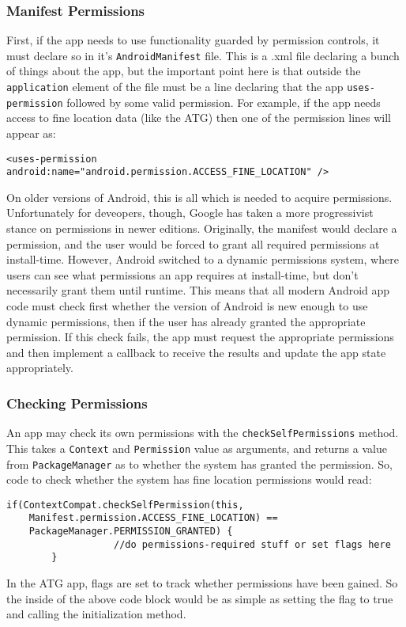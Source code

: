 \subsubsection{Manifest Permissions}
First, if the app needs to use functionality guarded by permission controls, it must declare so in it's \verb|AndroidManifest| file. This is a .xml file declaring a bunch of
things about the app, but the important point here is that outside the \verb|application| element of the file must be a line declaring that the app \verb|uses-permission|
followed by some valid permission. For example, if the app needs access to fine location data (like the ATG) then one of the permission lines will appear as:
\begin{verbatim}
<uses-permission android:name="android.permission.ACCESS_FINE_LOCATION" />
\end{verbatim}
On older versions of Android, this is all which is needed to acquire permissions. Unfortunately for deveopers, though, Google has taken a more progressivist stance on
permissions in newer editions. Originally, the manifest would declare a permission, and the user would be forced to grant all required permissions at install-time. However,
Android switched to a dynamic permissions system, where users can see what permissions an app requires at install-time, but don't necessarily grant them until runtime. This
means that all modern Android app code must check first whether the version of Android is new enough to use dynamic permissions, then if the user has already granted the
appropriate permission. If this check fails, the app must request the appropriate permissions and then implement a callback to receive the results and update the app state
appropriately. 

\subsubsection{Checking Permissions}
An app may check its own permissions with the \verb|checkSelfPermissions| method. This takes a \verb|Context| and \verb|Permission| value as arguments, and returns
a value from \verb|PackageManager| as to whether the system has granted the permission. So, code to check whether the system has fine location permissions would read:
\begin{verbatim}
if(ContextCompat.checkSelfPermission(this, 
	Manifest.permission.ACCESS_FINE_LOCATION) == 
	PackageManager.PERMISSION_GRANTED) {
                   //do permissions-required stuff or set flags here 
        }
\end{verbatim}
In the ATG app, flags are set to track whether permissions have been gained. So the inside of the above code block would be as simple as setting the flag to true and calling
the initialization method.

